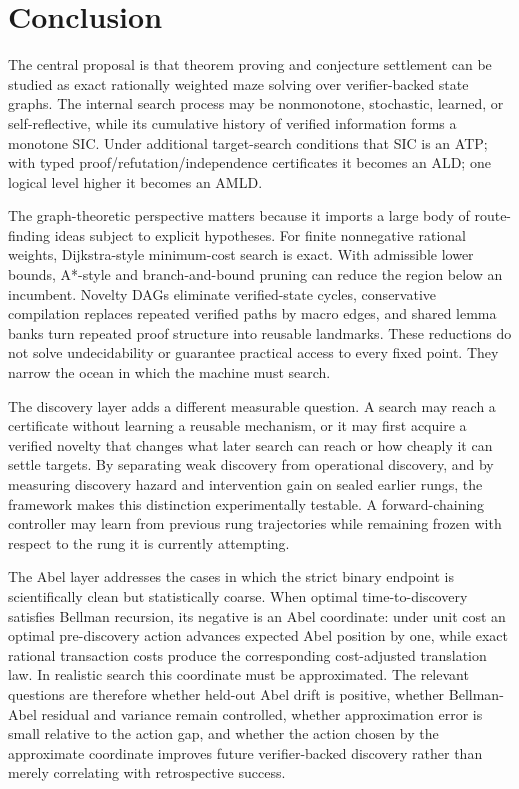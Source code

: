 \section{Conclusion}
The central proposal is that theorem proving and conjecture settlement can be studied as exact rationally weighted maze solving over verifier-backed state graphs. The internal search process may be nonmonotone, stochastic, learned, or self-reflective, while its cumulative history of verified information forms a monotone SIC. Under additional target-search conditions that SIC is an ATP; with typed proof/refutation/independence certificates it becomes an ALD; one logical level higher it becomes an AMLD.

The graph-theoretic perspective matters because it imports a large body of route-finding ideas subject to explicit hypotheses. For finite nonnegative rational weights, Dijkstra-style minimum-cost search is exact. With admissible lower bounds, A*-style and branch-and-bound pruning can reduce the region below an incumbent. Novelty DAGs eliminate verified-state cycles, conservative compilation replaces repeated verified paths by macro edges, and shared lemma banks turn repeated proof structure into reusable landmarks. These reductions do not solve undecidability or guarantee practical access to every fixed point. They narrow the ocean in which the machine must search.

The discovery layer adds a different measurable question. A search may reach a certificate without learning a reusable mechanism, or it may first acquire a verified novelty that changes what later search can reach or how cheaply it can settle targets. By separating weak discovery from operational discovery, and by measuring discovery hazard and intervention gain on sealed earlier rungs, the framework makes this distinction experimentally testable. A forward-chaining controller may learn from previous rung trajectories while remaining frozen with respect to the rung it is currently attempting.

The Abel layer addresses the cases in which the strict binary endpoint is scientifically clean but statistically coarse. When optimal time-to-discovery satisfies Bellman recursion, its negative is an Abel coordinate: under unit cost an optimal pre-discovery action advances expected Abel position by one, while exact rational transaction costs produce the corresponding cost-adjusted translation law. In realistic search this coordinate must be approximated. The relevant questions are therefore whether held-out Abel drift is positive, whether Bellman-Abel residual and variance remain controlled, whether approximation error is small relative to the action gap, and whether the action chosen by the approximate coordinate improves future verifier-backed discovery rather than merely correlating with retrospective success.

